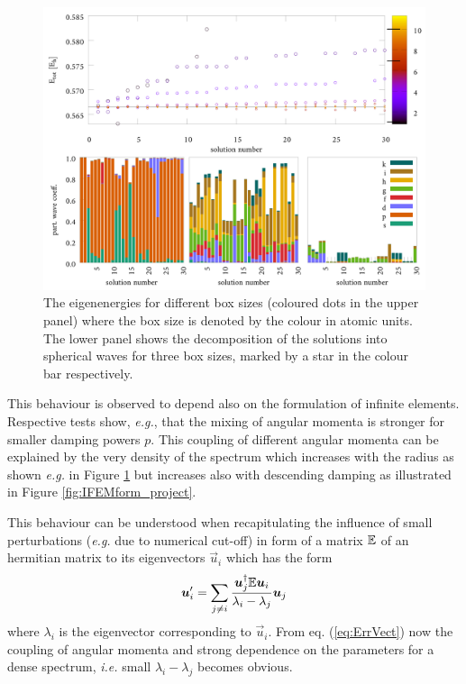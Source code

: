\begin{figure}
\includegraphics[width=\textwidth]{Figures/RadWave_p0_001.pdf}
\caption{The eigenenergies for different box sizes (coloured dots in the upper panel) where the box size is denoted by the colour in atomic units.
The lower panel shows the decomposition of the solutions into spherical waves for three box sizes, marked by a star in the colour bar respectively.}
\label{fig:RadWaves}
\end{figure}
This behaviour is observed to depend also on the formulation of infinite elements.
Respective tests show, \textit{e.g.}, that the mixing of angular momenta is stronger for smaller damping powers $p$.
This coupling of different angular momenta can be explained by the very density of the spectrum which increases with the radius as shown \textit{e.g.} in Figure \ref{fig:RadWaves} but increases also with descending damping as illustrated in Figure \ref{fig:IFEMform_project}.

This behaviour can be understood when recapitulating the influence of small perturbations (\textit{e.g.} due to numerical cut-off) in form of a matrix $\mathbb{E}$ of an hermitian matrix to its eigenvectors $\vec{u}_i$ which has the form \cite{saad, wilkinson}
\begin{equation}\label{eq:ErrVect}
\bm{u}'_i=\sum_{j\neq i} \frac{\bm{u}_j^\dagger\mathbb{E}\bm{u}_i}{\lambda_i-\lambda_j} \bm{u}_j
\end{equation}
where $\lambda_i$ is the eigenvector corresponding to $\vec{u}_i$.
From eq. (\ref{eq:ErrVect}) now the coupling of angular momenta and strong dependence on the parameters for a dense spectrum, \textit{i.e.} small $\lambda_i-\lambda_j$ becomes obvious.


